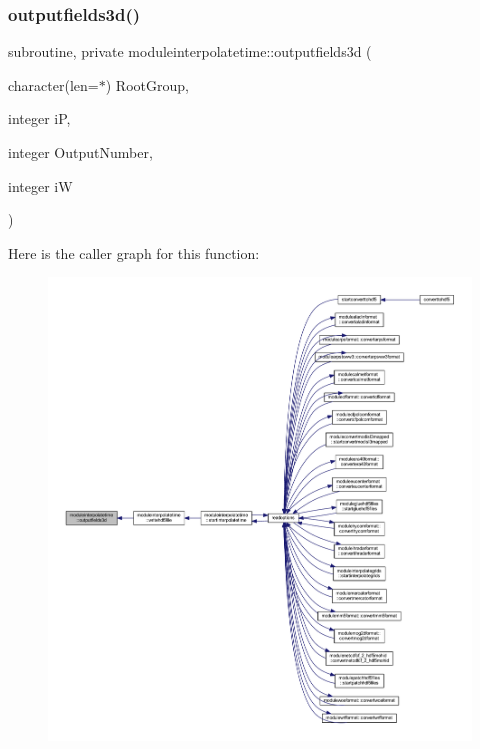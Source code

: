 \subsubsection{\texorpdfstring{outputfields3d()}{outputfields3d()}}
{\footnotesize\ttfamily subroutine, private moduleinterpolatetime\+::outputfields3d (\begin{DoxyParamCaption}\item[{character(len=$\ast$)}]{Root\+Group,  }\item[{integer}]{iP,  }\item[{integer}]{Output\+Number,  }\item[{integer}]{iW }\end{DoxyParamCaption})\hspace{0.3cm}{\ttfamily [private]}}

Here is the caller graph for this function\+:\nopagebreak
\begin{figure}[H]
\begin{center}
\leavevmode
\includegraphics[width=350pt]{namespacemoduleinterpolatetime_afb140a4246a55d10d57741eac9e8472e_icgraph}
\end{center}
\end{figure}
\mbox{\label{namespacemoduleinterpolatetime_a0a16c53d72886b47809d200696776b0c}} 
